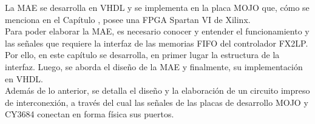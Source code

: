 La MAE se desarrolla en VHDL y se implementa en la placa MOJO que, cómo se menciona en el Capítulo%
, posee una FPGA Spartan VI de Xilinx.\\

Para poder elaborar la MAE, es necesario conocer y entender el funcionamiento y las señales que requiere la interfaz de las memorias FIFO del controlador FX2LP.\\

Por ello, en este capítulo se desarrolla, en primer lugar la estructura de la interfaz. Luego, se aborda el diseño de la MAE y finalmente, su implementación en VHDL.\\

Además de lo anterior, se detalla el diseño y la elaboración de un circuito impreso de interconexión, a través del cual las señales de las placas de desarrollo MOJO y CY3684 conectan en forma física sus puertos.\\
